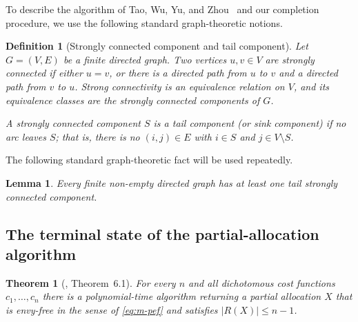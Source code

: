 \documentclass[11pt]{article}
\theoremstyle{plain}
\newtheorem{theorem}{Theorem}
\newtheorem{lemma}{Lemma}
\newtheorem{definition}{Definition}
\theoremstyle{plain}
\newcommand{\cost}{c}
\newcommand{\abs}[1]{\left\lvert#1\right\rvert}
\begin{document}
To describe the algorithm of Tao, Wu, Yu, and Zhou~\cite{tao2025existence} and our completion procedure, we use the following standard graph-theoretic notions.

\begin{definition}[Strongly connected component and tail component]
\label{def:scc}
Let $G=(V,E)$ be a finite directed graph. Two vertices \(u,v\in V\) are \emph{strongly connected} if either \(u=v\), or there is a directed path from \(u\) to \(v\) and a directed path from \(v\) to \(u\). Strong connectivity is an equivalence relation on $V$, and its equivalence classes are the \emph{strongly connected components} of $G$.

A strongly connected component $S$ is a \emph{tail component} (or \emph{sink component}) if no arc leaves $S$; that is, there is no $(i,j)\in E$ with $i\in S$ and $j\in V\setminus S$.
\end{definition}

The following standard graph-theoretic fact will be used repeatedly.

\begin{lemma} \label{lem:tail-scc-exists} Every finite non-empty directed graph has at least one tail strongly connected component.
\end{lemma}


\subsection{The terminal state of the partial-allocation algorithm}
\label{sec:m-terminal}

\begin{theorem}[\cite{tao2025existence}, Theorem~6.1] \label{thm:m-twyz} For every $n$ and all dichotomous cost functions $\cost_1,\dots,\cost_n$ there is a polynomial-time algorithm returning a partial allocation $X$ that is envy-free in the sense of \eqref{eq:m-pef} and satisfies $\abs{R(X)} \le n-1$. \end{theorem}
\end{document}
